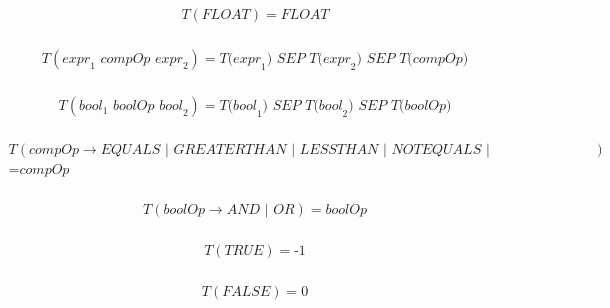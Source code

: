 \documentclass[a4paper,12pt]{article}
\begin{document}
\begin{landscape}
\begin{equation} 
\begin{aligned}
    T( \textit{FLOAT})
    = \textit{FLOAT}\\
\end{aligned}
\end{equation}

\begin{equation} 
\begin{aligned}
    T( \textit{expr}_{1} \textit{ compOp expr}_{2})
    = \textit{T(expr}_{1} \textit{) SEP T(expr}_{2} \textit{) SEP T(compOp)}\\
\end{aligned}
\end{equation}

\begin{equation} 
\begin{aligned}
    T( \textit{bool}_{1} \textit{ boolOp bool}_{2})
    = \textit{T(bool}_{1} \textit{) SEP T(bool}_{2} \textit{) SEP T(boolOp)}\\
\end{aligned}
\end{equation}

\begin{equation} 
\begin{aligned}
    T( \textit{compOp} \rightarrow \textit{EQUALS | GREATERTHAN | LESSTHAN | NOTEQUALS | LESSTHANOREQUALS | GREATERTHANOREQUALS})\\
    = \textit{compOp}\\
\end{aligned}
\end{equation}

\begin{equation} 
\begin{aligned}
    T( \textit{boolOp} \rightarrow \textit{AND | OR})
    = \textit{boolOp}\\
\end{aligned}
\end{equation}

\begin{equation} 
\begin{aligned}
    T( \textit{TRUE})
    = \textit{-1}\\
\end{aligned}
\end{equation}

\begin{equation} 
\begin{aligned}
    T( \textit{FALSE})
    = \textit{0}\\
\end{aligned}
\end{equation}


\end{landscape}
\end{document}
